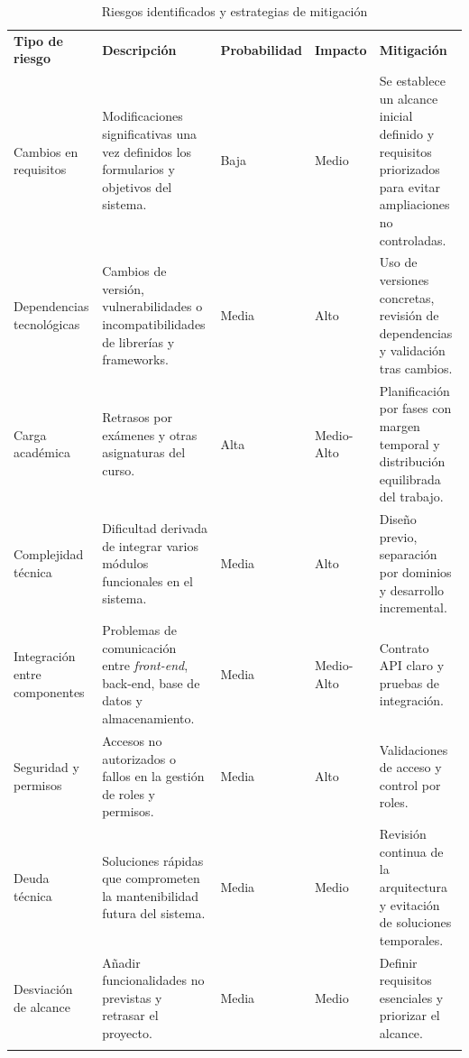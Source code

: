 \begin{table}[H]
    \centering
    \renewcommand{\arraystretch}{1.25}
    \begin{tabularx}{\textwidth}{>{\RaggedRight\arraybackslash}p{2.1cm} >{\RaggedRight\arraybackslash}X p{1.6cm} p{1.6cm} >{\RaggedRight\arraybackslash}X}
        \textbf{Tipo de riesgo} & \textbf{Descripción} & \textbf{Probabilidad} & \textbf{Impacto} & \textbf{Mitigación} \\ \lightrule
        Cambios en requisitos &
        Modificaciones significativas una vez definidos los formularios y objetivos del sistema. &
        Baja &
        Medio &
        Se establece un alcance inicial definido y requisitos priorizados para evitar ampliaciones no controladas. \\ \lightrule
        Dependencias tecnológicas &
        Cambios de versión, vulnerabilidades o incompatibilidades de librerías y frameworks. &
        Media &
        Alto &
        Uso de versiones concretas, revisión de dependencias y validación tras cambios. \\ \lightrule
        Carga académica &
        Retrasos por exámenes y otras asignaturas del curso. &
        Alta &
        Medio-Alto &
        Planificación por fases con margen temporal y distribución equilibrada del trabajo. \\ \lightrule
        Complejidad técnica &
        Dificultad derivada de integrar varios módulos funcionales en el sistema. &
        Media &
        Alto &
        Diseño previo, separación por dominios y desarrollo incremental. \\ \lightrule
        Integración entre componentes &
        Problemas de comunicación entre \emph{front-end}, back-end, base de datos y almacenamiento. &
        Media &
        Medio-Alto &
        Contrato API claro y pruebas de integración. \\ \lightrule
        Seguridad y permisos &
        Accesos no autorizados o fallos en la gestión de roles y permisos. &
        Media &
        Alto &
        Validaciones de acceso y control por roles. \\ \lightrule
        Deuda técnica &
        Soluciones rápidas que comprometen la mantenibilidad futura del sistema. &
        Media &
        Medio &
        Revisión continua de la arquitectura y evitación de soluciones temporales. \\ \lightrule
        Desviación de alcance &
        Añadir funcionalidades no previstas y retrasar el proyecto. &
        Media &
        Medio &
        Definir requisitos esenciales y priorizar el alcance. \\ \lightrule
    \end{tabularx}
    \caption{Riesgos identificados y estrategias de mitigación}
    \label{tab:risks_management}
\end{table}
